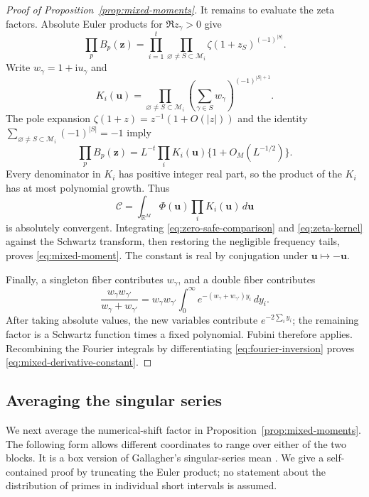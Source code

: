 \begin{proof}[Proof of Proposition~\ref{prop:mixed-moments}]
It remains to evaluate the zeta factors. Absolute Euler products for
$\Re z_\gamma>0$ give
\[
 \prod_pB_p(\mathbf z)=\prod_{i=1}^t
 \prod_{\varnothing\ne S\subset\mathcal M_i}
 \zeta(1+z_S)^{(-1)^{|S|}}.
\]
Write $w_\gamma=1+\mathrm i u_\gamma$ and
\[
 K_i(\mathbf u)=\prod_{\varnothing\ne S\subset\mathcal M_i}
 \left(\sum_{\gamma\in S}w_\gamma\right)^{(-1)^{|S|+1}}.
\]
The pole expansion $\zeta(1+z)=z^{-1}(1+O(|z|))$ and the identity
$\sum_{\varnothing\ne S\subset\mathcal M_i}(-1)^{|S|}=-1$ imply
\begin{equation}\label{eq:zeta-kernel}
 \prod_pB_p(\mathbf z)
 =L^{-t}\prod_iK_i(\mathbf u)\{1+O_M(L^{-1/2})\}.
\end{equation}
Every denominator in $K_i$ has positive integer real part, so the product of
the $K_i$ has at most polynomial growth. Thus
\[
 \mathcal C=\int_{\mathbb R^M}\Phi(\mathbf u)\prod_iK_i(\mathbf u)\,d\mathbf u
\]
is absolutely convergent. Integrating \eqref{eq:zero-safe-comparison} and
\eqref{eq:zeta-kernel} against the Schwartz transform, then restoring the
negligible frequency tails, proves \eqref{eq:mixed-moment}. The constant is
real by conjugation under $\mathbf u\mapsto-\mathbf u$.

Finally, a singleton fiber contributes $w_\gamma$, and a double fiber
contributes
\[
 \frac{w_\gamma w_{\gamma'}}{w_\gamma+w_{\gamma'}}
 =w_\gamma w_{\gamma'}\int_0^\infty
 e^{-(w_\gamma+w_{\gamma'})y_i}\,dy_i.
\]
After taking absolute values, the new variables contribute
$e^{-2\sum_i y_i}$; the remaining factor is a Schwartz function times a fixed
polynomial. Fubini therefore applies. Recombining the Fourier integrals by
differentiating \eqref{eq:fourier-inversion} proves
\eqref{eq:mixed-derivative-constant}.
\end{proof}

\subsection{Averaging the singular series}\label{sec:singular-average}

We next average the numerical-shift factor in
Proposition~\ref{prop:mixed-moments}. The following form allows different
coordinates to range over either of the two blocks. It is a box version
of Gallagher's singular-series mean \cite[p.~5, equation~(3)]{Gallagher1976}.
We give a self-contained proof by truncating the Euler product;
no statement about the distribution of primes in individual short intervals
is assumed.

